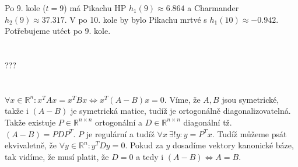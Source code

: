 \documentclass[12pt, a4paper]{article}
\begin{document}
Po 9. kole ($t=9$) má Pikachu HP $h_1(9) \approx 6.864$ a Charmander $h_2(9) \approx 37.317$. V po 10. kole by bylo Pikachu mrtvé s $h_1(10) \approx -0.942$. Potřebujeme utéct po 9. kole.

\section{}
???

\section{}
\subsection{}
$\forall x \in \mathbb{R}^n : x^T A x = x^T B x \iff x^T (A-B) x = 0$. Víme, že $A,B$ jsou symetrické, takže i $(A-B)$ je symetrická matice, tudíž je ortogonálně diagonalizovatelná. Takže existuje $P \in \mathbb{R}^{n \times n}$ ortogonální a $D \in \mathbb{R}^{n \times n}$ diagonální tž. $(A-B) = PDP^T$. $P$ je regulární a tudíž $\forall x \ \exists! y: y=P^Tx$. Tudíž můžeme psát ekvivaletně, že $\forall y \in \mathbb{R}^n: y^T D y = 0$. Pokud za $y$ dosadíme vektory kanonické báze, tak vidíme, že musí platit, že $D = 0$ a tedy i $(A-B) \iff A = B$.
\end{document}
